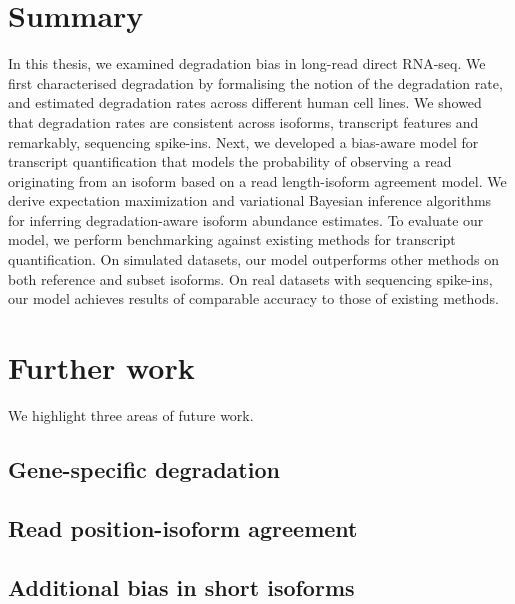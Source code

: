 
\section{Summary}

In this thesis, we examined degradation bias in long-read direct RNA-seq. We first characterised degradation by formalising the notion of the degradation rate, and estimated degradation rates across different human cell lines. We showed that degradation rates are consistent across isoforms, transcript features and remarkably, sequencing spike-ins. Next, we developed a bias-aware model for transcript quantification that models the probability of observing a read originating from an isoform based on a read length-isoform agreement model. We derive expectation maximization and variational Bayesian inference algorithms for inferring degradation-aware isoform abundance estimates. To evaluate our model, we perform benchmarking against existing methods for transcript quantification. On simulated datasets, our model outperforms other methods on both reference and subset isoforms. On real datasets with sequencing spike-ins, our model achieves results of comparable accuracy to those of existing methods. 

\section{Further work}

We highlight three areas of future work.

\subsection{Gene-specific degradation}

\subsection{Read position-isoform agreement}

\subsection{Additional bias in short isoforms}


